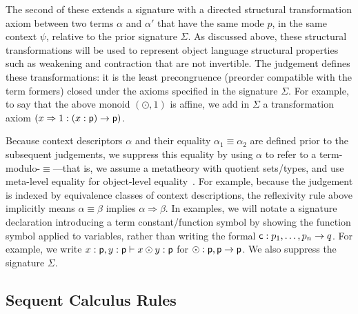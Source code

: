 \documentclass[a4paper,USenglish,numberwithinsect]{lipics-v2016}
\newcommand\deq{\ensuremath{\equiv}}
\newcommand\spr{\ensuremath{\Rightarrow}} %
\begin{document}
The second of these extends a signature with a directed structural
transformation axiom between two terms $\alpha$ and $\alpha'$ that have
the same mode $p$, in the same context $\psi$, relative to the prior
signature $\Sigma$.  As discussed above, these structural
transformations will be used to represent object language structural
properties such as weakening and contraction that are not invertible.
The judgement  defines these
transformations: it is the least precongruence (preorder compatible with
the term formers) closed under the axioms specified in the signature
$\Sigma$.  For example, to say that the above monoid $(\odot,1)$ is
affine, we add in $\Sigma$ a transformation axiom $(x \spr 1 : (x:\dsd{p}) \to
{\dsd{p}})$.

Because context descriptors $\alpha$ and their equality $\alpha_1 \deq
\alpha_2$ are defined prior to the subsequent judgements, we suppress
this equality by using $\alpha$ to refer to a term-modulo-\deq---that
is, we assume a metatheory with quotient sets/types, and use meta-level
equality for object-level equality~\cite{altenkirchkaposi16qit}.  For
example, because the judgement  is indexed
by equivalence classes of context descriptions, the reflexivity rule
above implicitly means $\alpha \deq \beta$ implies $\alpha \spr \beta$.
In examples, we will notate a signature declaration introducing a term
constant/function symbol by showing the function symbol applied to
variables, rather than writing the formal $\mathsf{c} : p_1,\ldots,p_n \to
q$. For example, we write $x : \mathsf{p}, y : \mathsf{p} \vdash x \odot y :
\mathsf{p}$ for $\odot : \mathsf{p},\mathsf{p} \to \mathsf{p}$.  We also suppress
the signature $\Sigma$.

\subsection{Sequent Calculus Rules}
\end{document}
